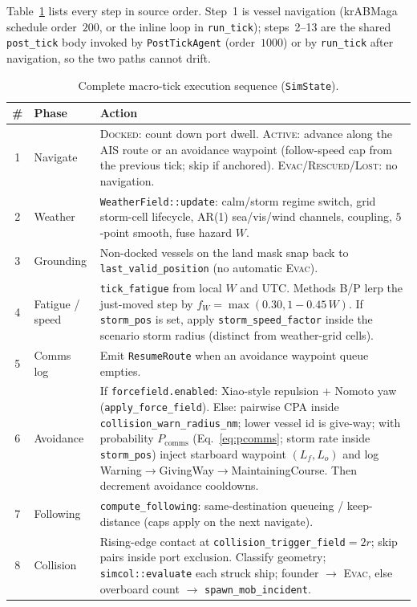 \documentclass[cameraready]{Interspeech}
\begin{document}
Table~\ref{tab:tick-steps} lists every step in source order. Step~1 is vessel navigation (krABMaga schedule order~$200$, or the inline loop in \texttt{run\_tick}); steps~2--13 are the shared \texttt{post\_tick} body invoked by \texttt{PostTickAgent} (order~$1000$) or by \texttt{run\_tick} after navigation, so the two paths cannot drift.

\begin{table}[t]
\caption{Complete macro-tick execution sequence (\texttt{SimState}).}
\label{tab:tick-steps}
\centering
\small
\begin{tabularx}{\textwidth}{@{}c l >{\raggedright\arraybackslash}X@{}}
\toprule
\# & Phase & Action \\
\midrule
1 & Navigate & \textsc{Docked}: count down port dwell. \textsc{Active}: advance along the AIS route or an avoidance waypoint (follow-speed cap from the previous tick; skip if anchored). \textsc{Evac}/\textsc{Rescued}/\textsc{Lost}: no navigation. \\[2pt]
2 & Weather & \texttt{WeatherField::update}: calm/storm regime switch, grid storm-cell lifecycle, AR(1) sea/vis/wind channels, coupling, $5$-point smooth, fuse hazard $W$. \\[2pt]
3 & Grounding & Non-docked vessels on the land mask snap back to \texttt{last\_valid\_position} (no automatic \textsc{Evac}). \\[2pt]
4 & Fatigue / speed & \texttt{tick\_fatigue} from local $W$ and UTC. Methods B/P lerp the just-moved step by $f_W=\max(0.30,1-0.45\,W)$. If \texttt{storm\_pos} is set, apply \texttt{storm\_speed\_factor} inside the scenario storm radius (distinct from weather-grid cells). \\[2pt]
5 & Comms log & Emit \texttt{ResumeRoute} when an avoidance waypoint queue empties. \\[2pt]
6 & Avoidance & If \texttt{forcefield.enabled}: Xiao-style repulsion + Nomoto yaw (\texttt{apply\_force\_field}). Else: pairwise CPA inside \texttt{collision\_warn\_radius\_nm}; lower vessel id is give-way; with probability $P_{\text{comms}}$ (Eq.~\ref{eq:pcomms}; storm rate inside \texttt{storm\_pos}) inject starboard waypoint $(L_f,L_o)$ and log Warning$\to$GivingWay$\to$MaintainingCourse. Then decrement avoidance cooldowns. \\[2pt]
7 & Following & \texttt{compute\_following}: same-destination queueing / keep-distance (caps apply on the next navigate). \\[2pt]
8 & Collision & Rising-edge contact at \texttt{collision\_trigger\_field}${}=2r$; skip pairs inside port exclusion. Classify geometry; \texttt{simcol::evaluate} each struck ship; founder $\to$ \textsc{Evac}, else overboard count $\to$ \texttt{spawn\_mob\_incident}. \\[2pt]

\end{tabularx}
\end{table}
\end{document}
